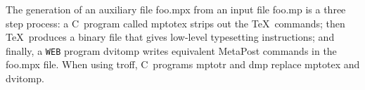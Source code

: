 \documentclass{article}
\def\lit#1{{\hbox{\textt#1}}}
\begin{document}
The generation of an auxiliary file \lit{foo.mpx} from an input file
\lit{foo.mp} is a three step process:  a C~program called \lit{mptotex}
strips out the \TeX\ commands; then \TeX\ produces a binary file that
gives low-level typesetting instructions; and finally, a {\tt WEB} program
\lit{dvitomp} writes equivalent MetaPost commands in the \lit{foo.mpx}
file.  When using troff, C~programs \lit{mptotr} and \lit{dmp} replace
\lit{mptotex} and \lit{dvitomp}.





\end{document}
